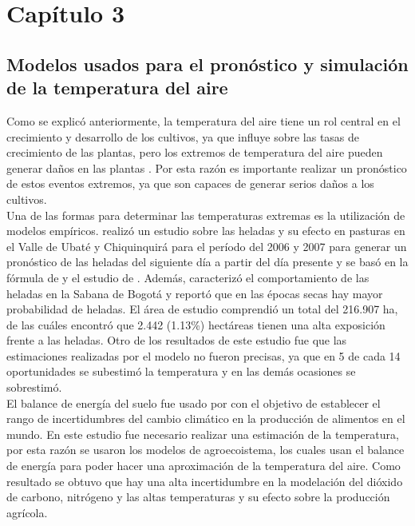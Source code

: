 \chapter{Capítulo 3}





\section{Modelos usados para el pronóstico y simulación de la temperatura del aire}

Como se explicó anteriormente, la temperatura del aire tiene un rol central en el crecimiento y desarrollo de los cultivos, ya que influye sobre las tasas de crecimiento de las plantas, pero los extremos de temperatura del aire pueden generar daños en las plantas \citep{wheeler2000}. Por esta razón es importante realizar un pronóstico de estos eventos extremos, ya que son capaces de generar serios daños a los cultivos.\\

Una de las formas para determinar las temperaturas extremas es la utilización de modelos empíricos. \citet{Gomez2014} realizó un estudio sobre las heladas y su efecto en pasturas en el Valle de Ubaté y Chiquinquirá para el período del 2006 y 2007 para generar un pronóstico de las heladas del siguiente día a partir del día presente y se basó en la fórmula de \citet{Allen1957} y el estudio de \citet{Snyder2010}. Además, caracterizó el comportamiento de las heladas en la Sabana de Bogotá y reportó que en las épocas secas hay mayor probabilidad de heladas. El área de estudio comprendió un total del 216.907 ha, de las cuáles \citet{Gomez2014} encontró que 2.442 (1.13\%) hectáreas tienen una alta exposición frente a las heladas. Otro de los resultados de este estudio fue que las estimaciones realizadas por el modelo no fueron precisas, ya que en 5 de cada 14 oportunidades se subestimó la temperatura y en las demás ocasiones se sobrestimó.\\

El balance de energía del suelo fue usado por \citet{Rosenzweig2014} con el objetivo de establecer el rango de incertidumbres del cambio climático en la producción de alimentos en el mundo. En este estudio fue necesario realizar una estimación de la temperatura, por esta razón se usaron los modelos de agroecoistema, los cuales usan el balance de energía para poder hacer una aproximación de la temperatura del aire. Como resultado se obtuvo que hay una alta incertidumbre en la modelación del dióxido de carbono, nitrógeno y las altas temperaturas y su efecto sobre la producción agrícola.\\

